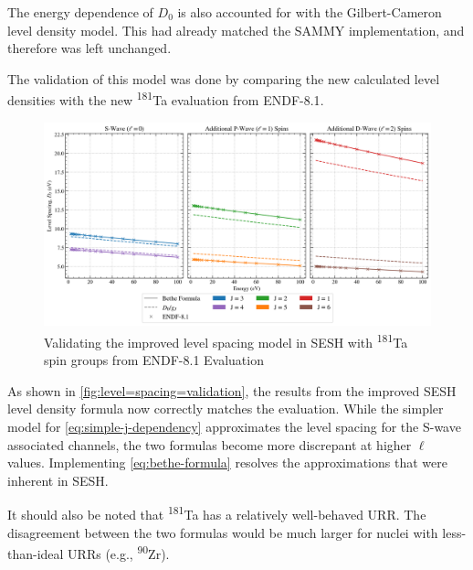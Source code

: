         The energy dependence of $D_0$ is also accounted for with the Gilbert-Cameron level density model\cite{gc-leveldensity}. This had already matched the SAMMY implementation, and therefore was left unchanged.

        The validation of this model was done by comparing the new calculated level densities with the new \textsuperscript{181}Ta evaluation from ENDF-8.1\cite{endf-8.1}.

        \begin{figure}[H]
            \centering
            \begin{adjustbox}{width=1.2\textwidth, center}
            \includegraphics{Implementation/Figures/validating-level-spacing.png} 
            \end{adjustbox}
            \caption{Validating the improved level spacing model in SESH with \textsuperscript{181}Ta spin groups from ENDF-8.1 Evaluation}
            \label{fig:level=spacing=validation}
        \end{figure}

        As shown in \autoref{fig:level=spacing=validation}, the results from the improved SESH level density formula now correctly matches the evaluation. While the simpler model for \autoref{eq:simple-j-dependency} approximates the level spacing for the S-wave associated channels, the two formulas become more discrepant at higher $\ell$ values. Implementing \autoref{eq:bethe-formula} resolves the approximations that were inherent in SESH.

        It should also be noted that \textsuperscript{181}Ta has a relatively well-behaved URR. The disagreement between the two formulas would be much larger for nuclei with less-than-ideal URRs (e.g., \textsuperscript{90}Zr).

